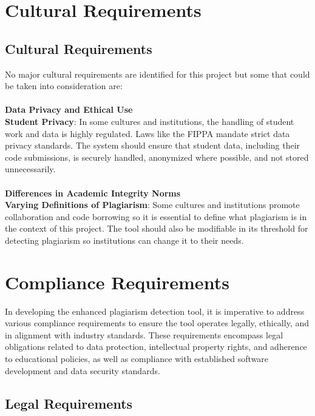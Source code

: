 \documentclass[12pt]{article}
\begin{document}
\section{Cultural Requirements}
\subsection{Cultural Requirements}
No major cultural requirements are identified for this project but some that could be taken into consideration are:\\ \\ 
\noindent \textbf{Data Privacy and Ethical Use}\\ 
\textbf{Student Privacy}: In some cultures and institutions, the handling of student work and data is highly regulated. Laws like the FIPPA mandate strict data privacy standards. The system should ensure that student data, including their code submissions, is securely handled, anonymized where possible, and not stored unnecessarily.
\\ \\
\noindent \textbf{Differences in Academic Integrity Norms}\\ 
\textbf{Varying Definitions of Plagiarism}: Some cultures and institutions promote collaboration and code borrowing so it is essential to define what plagiarism is in the context of this project. The tool should also be modifiable in its threshold for detecting plagiarism so institutions can change it to their needs.


\section{Compliance Requirements}

In developing the enhanced plagiarism detection tool, it is imperative to address
various compliance requirements to ensure the tool operates legally, ethically,
and in alignment with industry standards. These requirements encompass legal
obligations related to data protection, intellectual property rights, and
adherence to educational policies, as well as compliance with established software
development and data security standards.

\subsection{Legal Requirements}
\end{document}
